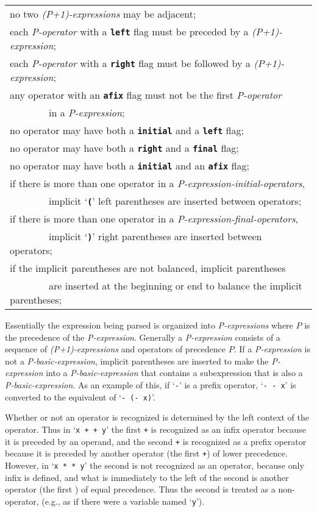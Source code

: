 \documentclass[12pt]{article}
\newcommand{\TT}[1]{{\tt \bfseries #1}}
\newenvironment{indpar}[1][0.3in]%
	{\begin{list}{}%
		     {\setlength{\itemsep}{0in}%
		      \setlength{\topsep}{0in}%
		      \setlength{\parsep}{1ex}%
		      \setlength{\labelwidth}{#1}%
		      \setlength{\leftmargin}{#1}%
		      \addtolength{\leftmargin}{\labelsep}}%
	 \item}%
	{\end{list}}
\begin{document}
\begin{indpar}
\begin{tabular}[t]{l}
       no two {\em (P+1)-expressions} may be adjacent; \\ 
       each {\em P-operator} with a \TT{left} flag must be
              preceded by a {\em (P+1)-expression}; \\
       each {\em P-operator} with a \TT{right} flag must be
	  followed by a {\em (P+1)-expression}; \\
       any operator with an \TT{afix} flag must not be the first
           {\em P-operator} \\
       ~~~~~~~~in a {\em P-expression}; \\
       no operator may have both a \TT{initial} and a \TT{left} flag; \\
       no operator may have both a \TT{right} and a \TT{final} flag; \\
       no operator may have both a \TT{initial} and an \TT{afix} flag; \\
       if there is more than one operator in a
           {\em P-expression-initial-operators}, \\
       ~~~~~~~~implicit `\TT{(}' left parentheses are inserted between
                                 operators; \\
       if there is more than one operator in a
           {\em P-expression-final-operators}, \\
       ~~~~~~~~implicit `\TT{)}' right parentheses are inserted between
                                 operators; \\
       if the implicit parentheses are not balanced, implicit parentheses \\
       ~~~~~~~~are inserted at the beginning or end to balance the
               implicit parentheses;
       \end{tabular}
\end{indpar}

Essentially the expression being parsed is organized into {\em P-expressions}
where $P$ is the precedence of the {\em P-expression}.  Generally
a {\em P-expression} consists of a sequence of {\em (P+1)-expressions}
and operators of precedence $P$.
If a {\em P-expression} is not a {\em P-basic-expression}, implicit
parentheses are inserted to make the {\em P-expression} into a
{\em P-basic-expression} that contains a subexpression that is
also a {\em P-basic-expression}.  As an example of this, if `{\tt -}'
is a prefix operator, `{\tt - - x}' is converted to the equivalent
of `{\tt - (- x)}'.

Whether or not an operator is recognized is determined by the left
context of the operator.  Thus in `{\tt x + + y}' the first {\tt +}
is recognized as an infix operator because it is preceded by an operand,
and the second {\tt +} is recognized as a prefix operator because it
is preceded by another operator (the first {\tt +}) of lower precedence.
However, in `{\tt x * * y}' the second {\tt *} is not recognized as
an operator, because only infix {\tt *} is defined, and what is immediately
to the left of the second {\tt *} is another operator (the first {\tt *})
of equal precedence.  Thus the second {\tt *} is treated as a non-operator,
(e.g., as if there were a variable named `{\tt * y}').
\end{document}
